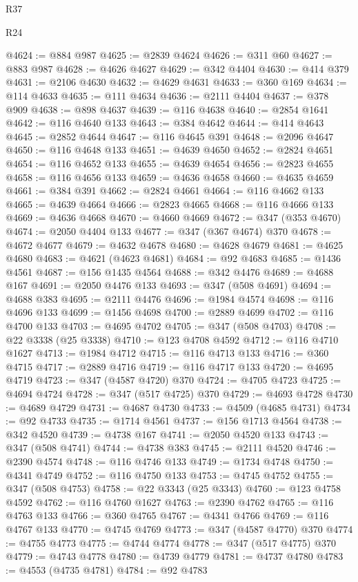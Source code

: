\begin{lexlean}{R37}
\begin{lexlean}{R24}
\begin{coremodule}
{{{{{{{{{{{{{{{{{{{{{{{{{{{{{{{{{{{{{{{{{{{{{{{{{{{{{{{{{{{{{{{{{{{{{{{{{{{{{{{{{{{{{{{{{{{{{{{{{{{{{{{{{{{{{{{{{{{{{{{{{{{{{{{{{{{{{{{{{{{{{{{{{{{{{{{{{{{{{{{{{{{{{{{{{{{{{{{{{{{{{{{{{@4624 := @884 @987
@4625 := @2839 @4624
@4626 := @311 @60
@4627 := @883 @987
@4628 := @4626 @4627
@4629 := @342 @4404
@4630 := @414 @379
@4631 := @2106 @4630
@4632 := @4629 @4631
@4633 := @360 @169
@4634 := @114 @4633
@4635 := @111 @4634
@4636 := @2111 @4404
@4637 := @378 @909
@4638 := @898 @4637
@4639 := @116 @4638
@4640 := @2854 @1641
@4642 := @116 @4640 @133
@4643 := @384 @4642
@4644 := @414 @4643
@4645 := @2852 @4644
@4647 := @116 @4645 @391
@4648 := @2096 @4647
@4650 := @116 @4648 @133
@4651 := @4639 @4650
@4652 := @2824 @4651
@4654 := @116 @4652 @133
@4655 := @4639 @4654
@4656 := @2823 @4655
@4658 := @116 @4656 @133
@4659 := @4636 @4658
@4660 := @4635 @4659
@4661 := @384 @391
@4662 := @2824 @4661
@4664 := @116 @4662 @133
@4665 := @4639 @4664
@4666 := @2823 @4665
@4668 := @116 @4666 @133
@4669 := @4636 @4668
@4670 := @4660 @4669
@4672 := @347 (@353 @4670)
@4674 := @2050 @4404 @133
@4677 := @347 (@367 @4674) @370
@4678 := @4672 @4677
@4679 := @4632 @4678
@4680 := @4628 @4679
@4681 := @4625 @4680
@4683 := @4621 (@4623 @4681)
@4684 := @92 @4683
@4685 := @1436 @4561
@4687 := @156 @1435 @4564
@4688 := @342 @4476
@4689 := @4688 @167
@4691 := @2050 @4476 @133
@4693 := @347 (@508 @4691)
@4694 := @4688 @383
@4695 := @2111 @4476
@4696 := @1984 @4574
@4698 := @116 @4696 @133
@4699 := @1456 @4698
@4700 := @2889 @4699
@4702 := @116 @4700 @133
@4703 := @4695 @4702
@4705 := @347 (@508 @4703)
@4708 := @22 @3338 (@25 @3338)
@4710 := @123 @4708 @4592
@4712 := @116 @4710 @1627
@4713 := @1984 @4712
@4715 := @116 @4713 @133
@4716 := @360 @4715
@4717 := @2889 @4716
@4719 := @116 @4717 @133
@4720 := @4695 @4719
@4723 := @347 (@4587 @4720) @370
@4724 := @4705 @4723
@4725 := @4694 @4724
@4728 := @347 (@517 @4725) @370
@4729 := @4693 @4728
@4730 := @4689 @4729
@4731 := @4687 @4730
@4733 := @4509 (@4685 @4731)
@4734 := @92 @4733
@4735 := @1714 @4561
@4737 := @156 @1713 @4564
@4738 := @342 @4520
@4739 := @4738 @167
@4741 := @2050 @4520 @133
@4743 := @347 (@508 @4741)
@4744 := @4738 @383
@4745 := @2111 @4520
@4746 := @2390 @4574
@4748 := @116 @4746 @133
@4749 := @1734 @4748
@4750 := @4341 @4749
@4752 := @116 @4750 @133
@4753 := @4745 @4752
@4755 := @347 (@508 @4753)
@4758 := @22 @3343 (@25 @3343)
@4760 := @123 @4758 @4592
@4762 := @116 @4760 @1627
@4763 := @2390 @4762
@4765 := @116 @4763 @133
@4766 := @360 @4765
@4767 := @4341 @4766
@4769 := @116 @4767 @133
@4770 := @4745 @4769
@4773 := @347 (@4587 @4770) @370
@4774 := @4755 @4773
@4775 := @4744 @4774
@4778 := @347 (@517 @4775) @370
@4779 := @4743 @4778
@4780 := @4739 @4779
@4781 := @4737 @4780
@4783 := @4553 (@4735 @4781)
@4784 := @92 @4783
}}}}}}}}}}}}}}}}}}}}}}}}}}}}}}}}}}}}}}}}}}}}}}}}}}}}}}}}}}}}}}}}}}}}}}}}}}}}}}}}}}}}}}}}}}}}}}}}}}}}}}}}}}}}}}}}}}}}}}}}}}}}}}}}}}}}}}}}}}}}}}}}}}}}}}}}}}}}}}}}}}}}}}}}}}}}}}}}}}}}}}}}}
\end{coremodule}
\end{lexlean}
\end{lexlean}
